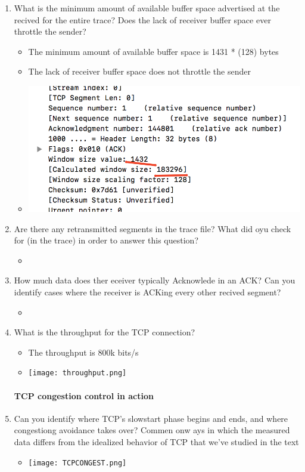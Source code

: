 \documentclass{article}
\begin{document}
\begin{enumerate}
    \item What is the minimum amount of available buffer space advertised at the recived for the entire trace?  Does the lack of receiver buffer space ever throttle the sender?
        \begin{itemize}
          \item The minimum amount of available buffer space is 1431 * (128) bytes
          \item The lack of receiver buffer space does not throttle the sender
          \item \includegraphics[scale=0.5]{images/TCPWIN.png}
        \end{itemize}

    \item Are there any retransmitted segments in the trace file?  What did oyu check for (in the trace) in order to answer this question?
        \begin{itemize}
          \item 
        \end{itemize}

    \item How much data does ther eceiver typically Acknowlede in an ACK?  Can you identify cases where the receiver is ACKing every other recived segment?
        \begin{itemize}
          \item 
        \end{itemize}

    \item What is the throughput for the TCP connection?
        \begin{itemize}
          \item The throughput is 800k bits/s
          \item \texttt{[image: throughput.png]}
        \end{itemize}
    \paragraph{TCP congestion control in action}
    \item Can you identify where TCP's slowstart phase begins and ends, and where congestiong avoidance takes over?  Commen onw ays in which the measured data differs from the idealized behavior of TCP that we've
    studied in the text
        \begin{itemize}
          \item \texttt{[image: TCPCONGEST.png]}
        \end{itemize}

    \end{enumerate}
\end{document}
